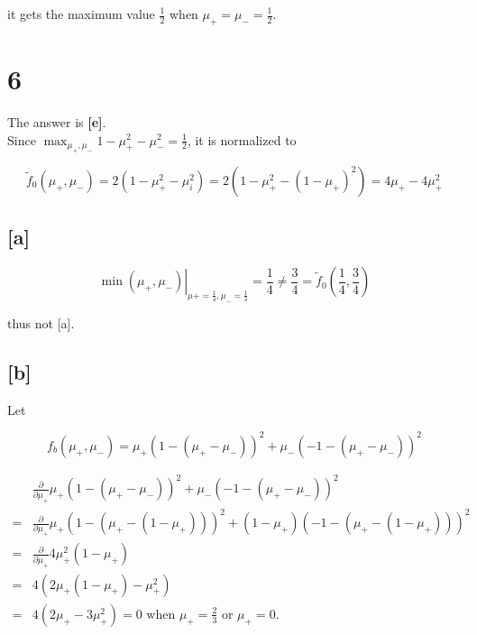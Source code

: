 \documentclass[fleqn,a4paper,12pt]{article}
\begin{document}
it gets the maximum value $\frac{1}{2}$ when $\mu_+ = \mu_- = \frac{1}{2}$.

\section*{6}

The answer is \textbf{[e]}.\\

Since $\max_{\mu_+, \mu_-} 1 - \mu_+^2 - \mu_-^2 = \frac{1}{2}$, it is normalized to

\begin{equation*}
  \tilde{f}_0(\mu_+, \mu_-) = 2(1 - \mu_+^2 - \mu_i^2) = 2(1 - \mu_+^2 - (1 - \mu_+)^2) = 4 \mu_+ - 4 \mu_+^2 
\end{equation*}

\subsection*{[a]}

\begin{equation*}
  \left. \min(\mu_+, \mu_-) \right|_{\mu+=\frac{1}{4}, \mu_-=\frac{1}{4}} = \frac{1}{4} \ne \frac{3}{4} = \tilde{f}_0(\frac{1}{4}, \frac{3}{4})
\end{equation*}

thus not [a].

\subsection*{[b]}

Let

\begin{equation*}
  f_b(\mu_+, \mu_-) = \mu_+(1 - (\mu_+ - \mu_-))^2 + \mu_-(-1 - (\mu_+ - \mu_-))^2
\end{equation*}

\begin{align*}
  &  \frac{\partial}{\partial \mu_+} \mu_+(1 - (\mu_+ - \mu_-))^2 + \mu_-(-1 - (\mu_+ - \mu_-))^2 \\
  =& \frac{\partial}{\partial \mu_+} \mu_+(1 - (\mu_+ - (1 - \mu_+)))^2 + (1 - \mu_+)(-1 - (\mu_+ - (1 - \mu_+)))^2 \\
  =& \frac{\partial}{\partial \mu_+}  4 \mu_+^2 (1 - \mu_+) \\  
  =& 4 (2\mu_+(1 - \mu_+) - \mu_+^2 ) \\
  =& 4 (2\mu_+ - 3 \mu_+^2 ) = 0 \text{ when $\mu_+ = \frac{2}{3}$ or  $\mu_+ = 0$.}
\end{align*}
\end{document}
